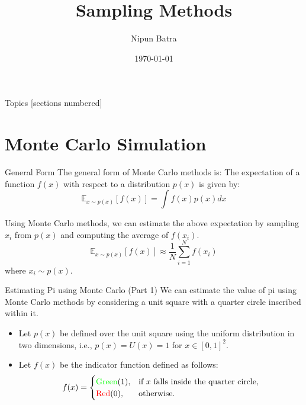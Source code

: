 \documentclass[handout]{beamer}
\begin{document}
\title{Sampling Methods}
\author{Nipun Batra}
\date{\today}
\maketitle

\begin{frame}{Topics}
    [sections numbered]
    \tableofcontents[hideallsubsections]

\end{frame}


\section{Monte Carlo Simulation}

\begin{frame}{General Form}
The general form of Monte Carlo methods is:
The expectation of a function $f(x)$ with respect to a distribution $p(x)$ is given by:
\begin{equation}
    \mathbb{E}_{x \sim p(x)}[f(x)] = \int f(x) p(x) dx
\end{equation}

Using Monte Carlo methods, we can estimate the above expectation by sampling $x_i$ from $p(x)$ and computing the average of $f(x_i)$.
\begin{equation}
    \mathbb{E}_{x \sim p(x)}[f(x)] \approx \frac{1}{N} \sum_{i=1}^{N} f(x_i)
\end{equation}
where $x_i \sim p(x)$.
\end{frame}
\begin{frame}[fragile]{Estimating Pi using Monte Carlo (Part 1)}
    We can estimate the value of pi using Monte Carlo methods by considering a unit square with a quarter circle inscribed within it.
    
    \begin{itemize}
        \item Let $p(x)$ be defined over the unit square using the uniform distribution in two dimensions, i.e., $p(x) = U(x) = 1$ for $x \in [0, 1]^2$.
        \item Let $f(x)$ be the indicator function defined as follows:
            \[
            f(x) = \begin{cases}
                        \text{\textcolor{green}{Green}} (1), & \text{if } x \text{ falls inside the quarter circle}, \\
                        \text{\textcolor{red}{Red}} (0), & \text{otherwise}.
                   \end{cases}
            \]
    \end{itemize}
\end{frame}
    
\end{document}

